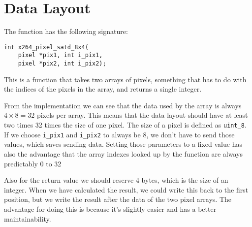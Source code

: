 \section{Data Layout}

The \satd{} function has the following signature:

\begin{verbatim}
int x264_pixel_satd_8x4(
    pixel *pix1, int i_pix1,
    pixel *pix2, int i_pix2);
\end{verbatim}

This is a function that takes two arrays of pixels, something that has to do
with the indices of the pixels in the array, and returns a single integer.

From the implementation we can see that the data used by the array is always $4
\times 8 = 32$ pixels per array. This means that the data layout should have at
least two times 32 times the size of one pixel. The size of a pixel is defined
as \texttt{uint\_8}. If we choose \texttt{i\_pix1} and \texttt{i\_pix2} to
always be 8, we don't have to send those values, which saves sending data.
Setting those parameters to a fixed value has also the advantage that the array
indexes looked up by the function are always predictably 0 to 32

Also for the return value we should reserve 4 bytes, which is the size of an
integer. When we have calculated the result, we could write this back to the
first position, but we write the result after the data of the two pixel arrays.
The advantage for doing this is because it's slightly easier and has a better
maintainability.
